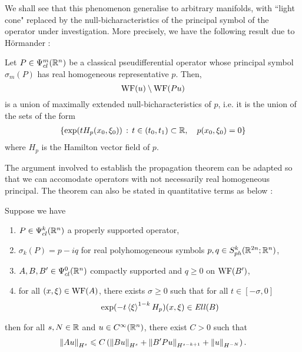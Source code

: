 \documentclass[12pt]{article}
\begin{document}
 We shall see that this phenomenon generalise to arbitrary manifolds, with ``light cone" replaced by the null-bicharacteristics of the principal symbol of the operator under investigation. More precisely, we have the following result due to H\"ormander \cite{Hormander1978-xs,Hormander2007-ws}: 
 \begin{ftheorem}
Let $P \in \Psi^{m}_{cl}(\R^n)$ be a classical pseudifferential operator whose principal symbol $\sigma_m(P)$ has real homogeneous representative $p$. Then, $$\WF(u) \setminus \WF(Pu) $$ is a union of maximally extended null-bicharacteristics of $p$, i.e. it is the union of the sets of the form
\begin{align*}
\set{\exp(t H_p(x_0, \xi_0)) \wh t \in (t_0, t_1)\subset \R, \quad p(x_0, \xi_0) = 0}
\end{align*}
where $H_p$ is the Hamilton vector field of $p$. 
\end{ftheorem}

The argument involved to establish the propagation theorem can be adapted so that we can accomodate operators with not necessarily real homogeneous principal. The theorem can also be stated in quantitative terms as below \cite{Semyon_Dyatlov2018-uk} : 



\begin{ftheorem} \label{theorem: propagation of singularity estimates}
    Suppose we have 
    \begin{enumerate}
        \item $P \in \Psi^k_{cl}(\R^n)$ a properly supported operator,
        \item $\sigma_{k}(P) = p - iq$ for real polyhomogeneous symbols $p, q \in S^{k}_{ph}(\R^{2n}; \R^{n})$, 
        \item $A, B, B' \in \Psi^{0}_{cl}(\R^n)$ compactly supported and $q \geq 0 $ on $\WF(B')$, 
        \item for all $(x, \xi) \in \WF(A)$, there exists $\sigma \geq 0$ such that for all $t \in [-\sigma, 0]$
        \begin{align*}
            \exp(-t\sym[\xi]^{1-k}H_p)(x, \xi) \in \Ell(B)
        \end{align*}
    \end{enumerate}
    then for all $s, N \in \R$ and $u \in C^\infty(\R^n)$, there exist $C > 0$ such that 
    \begin{align*}
        \norm[Au]_{H^s} \leq C\brac{\norm[Bu]_{H^s} + \norm[B'Pu]_{H^{s - k + 1}} + \norm[u]_{H^{-N}}}. 
    \end{align*}
\end{ftheorem}
\end{document}
